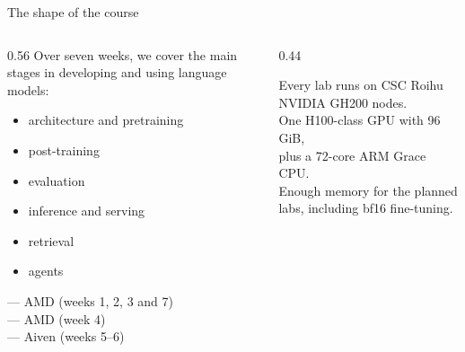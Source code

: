 \documentclass[aspectratio=169,10pt]{beamer}
\begin{document}
\begin{frame}{The shape of the course}
  \begin{columns}[T]
    \begin{column}{0.56\textwidth}
      Over seven weeks, we cover the main stages in developing and using
      language models:
      \begin{itemize}
        \item architecture and pretraining
        \item post-training
        \item evaluation
        \item inference and serving
        \item retrieval
        \item agents
      \end{itemize}
      \vspace{0.5em}
      \small
       --- AMD (weeks 1, 2, 3 and 7)\\
       --- AMD (week 4)\\
       --- Aiven (weeks 5--6)
    \end{column}
    \begin{column}{0.44\textwidth}
      \begin{block}{Every lab runs on CSC Roihu}
        \small
        NVIDIA GH200 nodes.\\
        One H100-class GPU with 96\,GiB,\\
        plus a 72-core ARM Grace CPU.\\[0.4em]
        Enough memory for the planned labs, including bf16 fine-tuning.
      \end{block}
    \end{column}
  \end{columns}
\end{frame}
\end{document}
